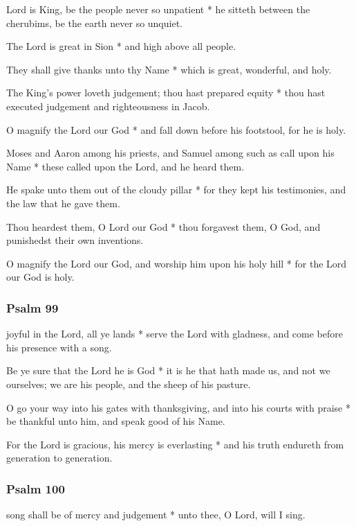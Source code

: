 
 Lord is King, be the people never so unpatient * he sitteth between the cherubims, be the earth never so unquiet.

The Lord is great in Sion * and high above all people.

They shall give thanks unto thy Name * which is great, wonderful, and holy.

The King's power loveth judgement; thou hast prepared equity * thou hast executed judgement and righteousness in Jacob.

O magnify the Lord our God * and fall down before his footstool, for he is holy.

Moses and Aaron among his priests, and Samuel among such as call upon his Name * these called upon the Lord, and he heard them.

He spake unto them out of the cloudy pillar * for they kept his testimonies, and the law that he gave them.

Thou heardest them, O Lord our God * thou forgavest them, O God, and punishedst their own inventions.

O magnify the Lord our God, and worship him upon his holy hill * for the Lord our God is holy.

\subsubsection{Psalm 99}


 joyful in the Lord, all ye lands * serve the Lord with gladness, and come before his presence with a song.

Be ye sure that the Lord he is God * it is he that hath made us, and not we ourselves; we are his people, and the sheep of his pasture.

O go your way into his gates with thanksgiving, and into his courts with praise * be thankful unto him, and speak good of his Name.

For the Lord is gracious, his mercy is everlasting * and his truth endureth from generation to generation.

\subsubsection{Psalm 100}


 song shall be of mercy and judgement * unto thee, O Lord, will I sing.

